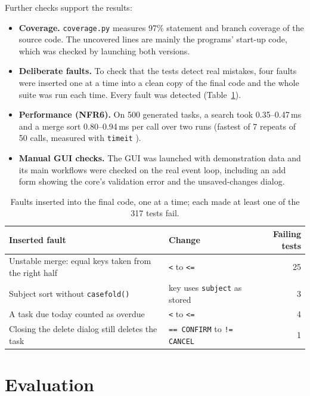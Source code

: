 \documentclass[11pt,a4paper]{article}
\newcommand{\code}[1]{\texttt{#1}}
\begin{document}
Further checks support the results:
\begin{itemize}
  \item \textbf{Coverage.} \code{coverage.py} \parencite{coveragepy}
        measures 97\% statement and branch
        coverage of the source code. The uncovered lines are mainly the
        programs' start-up code, which was checked by launching both versions.
  \item \textbf{Deliberate faults.} To check that the tests detect real
        mistakes, four faults were inserted one at a time into a clean copy
        of the final code and the whole suite was run each time. Every fault
        was detected (Table~\ref{tab:faults}).
  \item \textbf{Performance (NFR6).} On 500 generated tasks, a search took
        0.35--0.47\,ms and a merge sort 0.80--0.94\,ms per call over two runs
        (fastest of 7 repeats of 50 calls, measured with \code{timeit}
        \parencite{python-timeit}).
  \item \textbf{Manual GUI checks.} The GUI was launched with demonstration
        data and its main workflows were checked on the real event loop,
        including an add form showing the core's validation error and the
        unsaved-changes dialog.
\end{itemize}

\begin{table}[ht]
\centering
\small
\begin{tabularx}{\textwidth}{@{}Xlr@{}}
\toprule
Inserted fault & Change & Failing tests \\
\midrule
Unstable merge: equal keys taken from the right half & \code{<} to \code{<=} & 25 \\
Subject sort without \code{casefold()} & key uses \code{subject} as stored & 3 \\
A task due today counted as overdue & \code{<} to \code{<=} & 4 \\
Closing the delete dialog still deletes the task & \code{== CONFIRM} to \code{!= CANCEL} & 1 \\
\bottomrule
\end{tabularx}
\caption{Faults inserted into the final code, one at a time; each made at
least one of the 317 tests fail.}
\label{tab:faults}
\end{table}

\section{Evaluation}
\end{document}

